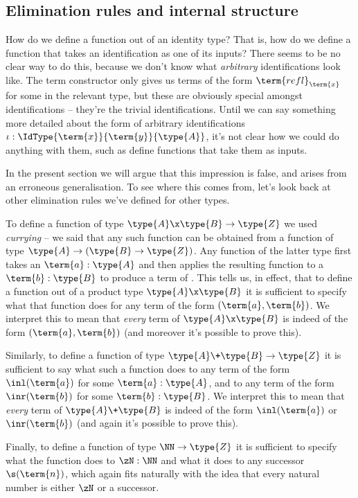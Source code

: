 \newpage
\subsection{Elimination rules and internal structure}


How do we define a function out of an identity type?  That is, how do we define a function that takes an identification as one of its inputs?  There seems to be no clear way to do this, because we don't know what \emph{arbitrary} identifications look like.  The term constructor only gives us terms of the form $\term{refl}_{\term{x}}$ for some  in the relevant type, but these are obviously special amongst identifications -- they're the trivial identifications.  Until we can say something more detailed about the form of arbitrary identifications $\iota:\IdType{\term{x}}{\term{y}}{\type{A}}$, it's not clear how we could do anything with them, such as define functions that take them as inputs.

In the present section we will argue that this impression is false, and arises from an erroneous generalisation.  To see where this comes from, let's look back at other elimination rules we've defined for other types.

To define a function of type $\type{A} \x \type{B} \to \type{Z}$ we used \emph{currying} -- we said that any such function can be obtained from a function of type $\type{A} \to (\type{B} \to \type{Z})$.  Any function of the latter type first takes an $\term{a}:\type{A}$ and then applies the resulting function to a $\term{b}:\type{B}$ to produce a term of .  This tells us, in effect, that to define a function out of a product type $\type{A} \x \type{B}$ it is sufficient to specify what that function does for any term of the form $(\term{a},\term{b})$.  We interpret this to mean that \emph{every} term of $\type{A} \x \type{B}$ is indeed of the form $(\term{a},\term{b})$ (and moreover it's possible to prove this).

Similarly, to define a function of type $\type{A} \+ \type{B} \to \type{Z}$ it is sufficient to say what such a function does to 
any term of the form $\inl(\term{a})$ for some $\term{a}:\type{A}$, and to
any term of the form $\inr(\term{b})$ for some $\term{b}:\type{B}$.  We interpret this to mean that \emph{every} term of $\type{A} \+ \type{B}$ is indeed of the form $\inl(\term{a})$ or $\inr(\term{b})$ (and again it's possible to prove this).

Finally, to define a function of type $\NN \to \type{Z}$ it is sufficient to specify what the function does to $\zN:\NN$ and what it does to any successor $\s(\term{n})$, which again fits naturally with the idea that every natural number is either $\zN$ or a successor.


